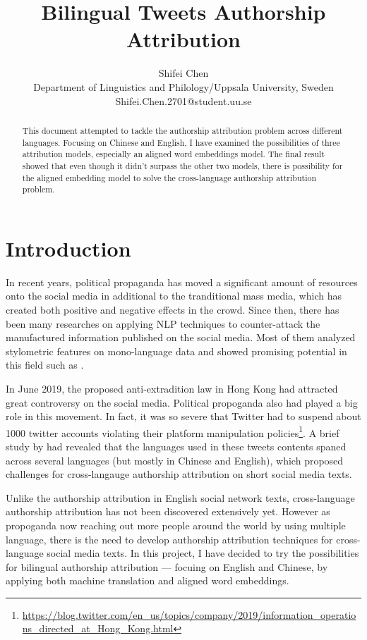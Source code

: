 \documentclass[11pt,a4paper]{article}
\title{Bilingual Tweets Authorship Attribution}
\author{
 Shifei Chen \\
 Department of Linguistics and Philology/Uppsala University, Sweden \\
  {\sf Shifei.Chen.2701@student.uu.se} \\
}
\date{}
\begin{document}
\maketitle
\begin{abstract}
  This document attempted to tackle the authorship attribution problem across different languages. Focusing on Chinese and English, I have examined the possibilities of three attribution models, especially an aligned word embeddings model. The final result showed that even though it didn't surpass the other two models, there is possibility for the aligned embedding model to solve the cross-language authorship attribution problem.
\end{abstract}

\section{Introduction}
In recent years, political propaganda has moved a significant amount of resources onto the social media in additional to the tranditional mass media, which has created both positive and negative effects in the crowd. Since then, there has been many researches on applying NLP techniques to counter-attack the manufactured information published on the social media. Most of them analyzed stylometric features on mono-language data and showed promising potential in this field such as \citet{rocha2016authorship}.

In June 2019, the proposed anti-extradition law in Hong Kong had attracted great controversy on the social media. Political propoganda also had played a big role in this movement. In fact, it was so severe that Twitter had to suspend about 1000 twitter accounts violating their platform manipulation policies\footnote{\url{https://blog.twitter.com/en_us/topics/company/2019/information_operations_directed_at_Hong_Kong.html}}. A brief study by \citet{wood_mcminn_feng_2019} had revealed that the languages used in these tweets contents spaned across several languages (but mostly in Chinese and English), which proposed challenges for cross-langauge authorship attribution on short social media texts.

Unlike the authorship attribution in English social network texts, cross-language authorship attribution has not been discovered extensively yet. However as propoganda now reaching out more people around the world by using multiple language, there is the need to develop authorship attribution techniques for cross-language social media texts. In this project, I have decided to try the possibilities for bilingual authorship attribution --- focuing on English and Chinese, by applying both machine translation and aligned word embeddings.
\end{document}
